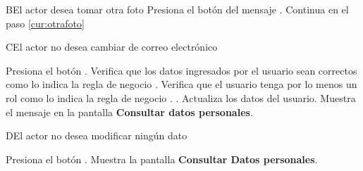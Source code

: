 \begin{UCtrayectoriaA}{B}{El actor desea tomar otra foto}
	\UCpaso [\UCactor] Presiona el botón  del mensaje .
	\UCpaso Continua en el paso \ref{cur:otrafoto}
\end{UCtrayectoriaA}


%	


\begin{UCtrayectoriaA}{C}{El actor no desea cambiar de correo electrónico}
	
	\UCpaso [\UCactor] Presiona el botón .
	\UCpaso Verifica que los datos ingresados por el usuario sean correctos como lo indica la regla de negocio . 
	\UCpaso Verifica que el usuario tenga por lo menos un rol como lo indica la regla de negocio . .
	\UCpaso Actualiza los datos del usuario.
	\UCpaso Muestra el mensaje  en la pantalla \textbf{Consultar datos personales}.
\end{UCtrayectoriaA}



\begin{UCtrayectoriaA}{D}{El actor no desea modificar ningún dato}
		
	\UCpaso [\UCactor] Presiona el botón .
	\UCpaso Muestra la pantalla \textbf{Consultar Datos personales}.

\end{UCtrayectoriaA}

